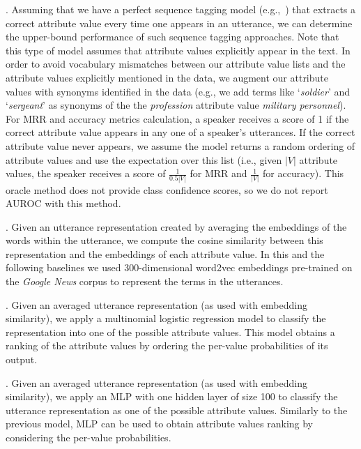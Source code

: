 .
Assuming that we have a perfect sequence tagging model (e.g.,~\cite{dial7}) that extracts a correct attribute value every time one appears in an utterance, we can determine the upper-bound performance of such sequence tagging approaches. Note that this type of model assumes that attribute values explicitly appear in the text.
In order to avoid vocabulary mismatches between our attribute value lists and the attribute values explicitly mentioned in the data, we augment our attribute values with synonyms identified in the data
(e.g., we add terms like `\textit{soldier}' and `\textit{sergeant}' as synonyms of the 
the \textit{profession} attribute value \textit{military personnel}).
For MRR and accuracy metrics calculation, a speaker receives a score of 1 if the correct attribute value appears in any one of a speaker's utterances. If the correct attribute value never appears, we assume the model returns a random ordering of attribute values and use the expectation over this list (i.e., given $|V|$ attribute values, the speaker receives a score of $\frac{1}{0.5|V|}$ for MRR and $\frac{1}{|V|}$ for accuracy). This oracle method does not provide class confidence scores, so we do not report AUROC with this method.

.
Given an utterance representation created by averaging the embeddings of the words within the utterance,
we compute the cosine similarity between this representation and the embeddings of each attribute value. In this and the following baselines we used 300-dimensional \gls{word2vec} embeddings pre-trained on the \textit{Google News} corpus \cite{embed1} to represent the terms in the utterances. 

. 
Given an averaged utterance representation (as used with embedding similarity),
we apply a multinomial logistic regression model \cite{mccullagh2019generalized} to classify the representation into one of the possible attribute values. This model obtains a ranking of the attribute values by ordering the per-value probabilities of its output.

. Given an averaged utterance representation (as used with embedding similarity), we apply an MLP with one hidden layer of size 100 to classify the utterance representation as one of the possible attribute values. Similarly to the previous model, MLP can be used to obtain attribute values ranking by considering the per-value probabilities.

